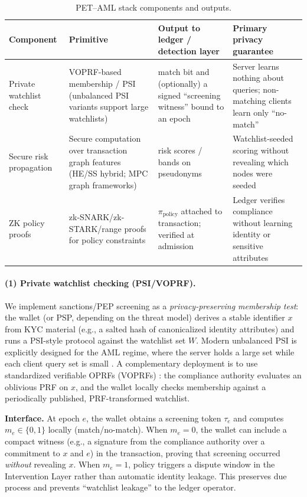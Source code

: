 \documentclass[11pt]{article}
\begin{document}
\begin{table}[H]
\centering
\caption{PET--AML stack components and outputs.}
\label{tab:pet-aml-components}
\begin{tabular}{p{3.1cm} p{4.3cm} p{3.6cm} p{2.8cm}}
\toprule
\textbf{Component} & \textbf{Primitive} & \textbf{Output to ledger / detection layer} & \textbf{Primary privacy guarantee} \\
\midrule
Private watchlist check & VOPRF-based membership / PSI (unbalanced PSI variants support large watchlists) \citep{rfc9497,Wang2025UnbalancedPSI} & match bit and (optionally) a signed ``screening witness'' bound to an epoch & Server learns nothing about queries; non-matching clients learn only ``no-match'' \\
\addlinespace
Secure risk propagation & Secure computation over transaction graph features (HE/SS hybrid; MPC graph frameworks) \citep{Koti2024Graphiti,Yu2025GraphAce} & risk scores / bands on pseudonyms & Watchlist-seeded scoring without revealing which nodes were seeded \\
\addlinespace
ZK policy proofs & zk-SNARK/zk-STARK/range proofs for policy constraints \citep{Groth2016,PLONK2019,STARK2018,ElHajj2024ZKBench} & $\pi_{\text{policy}}$ attached to transaction; verified at admission & Ledger verifies compliance without learning identity or sensitive attributes \\
\bottomrule
\end{tabular}
\end{table}

\paragraph{(1) Private watchlist checking (PSI/VOPRF).}
We implement sanctions/PEP screening as a \emph{privacy-preserving membership test}: the wallet (or PSP, depending on the threat model) derives a stable identifier $x$ from KYC material (e.g., a salted hash of canonicalized identity attributes) and runs a PSI-style protocol against the watchlist set $W$. Modern unbalanced PSI is explicitly designed for the AML regime, where the server holds a large set while each client query set is small \citep{Wang2025UnbalancedPSI}. A complementary deployment is to use standardized verifiable OPRFs (VOPRFs) \citep{rfc9497}: the compliance authority evaluates an oblivious PRF on $x$, and the wallet locally checks membership against a periodically published, PRF-transformed watchlist.

\textbf{Interface.} At epoch $e$, the wallet obtains a screening token $\tau_e$ and computes $m_e \in \{0,1\}$ locally (match/no-match). When $m_e=0$, the wallet can include a compact witness (e.g., a signature from the compliance authority over a commitment to $x$ and $e$) in the transaction, proving that screening occurred \emph{without} revealing $x$. When $m_e=1$, policy triggers a dispute window in the Intervention Layer rather than automatic identity leakage. This preserves due process and prevents ``watchlist leakage'' to the ledger operator.
\end{document}
